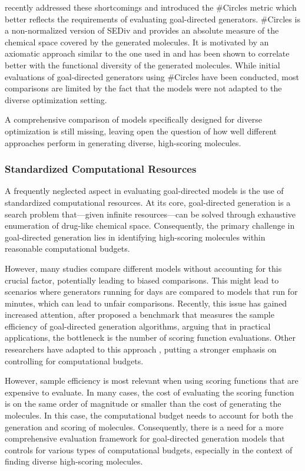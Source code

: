 \citet{xieHowMuchSpace2023} recently addressed these shortcomings and introduced the \#Circles
metric which better reflects the requirements of evaluating goal-directed generators. \#Circles is a
non-normalized version of SEDiv and provides an absolute measure of the chemical space covered by
the generated molecules. It is motivated by an axiomatic approach similar to the one used in
\citep{waldmanNovelAlgorithmsOptimization2000} and has been shown to correlate better with the
functional diversity of the generated molecules. While initial evaluations of goal-directed generators using \#Circles have been conducted, most comparisons are limited by the
fact that the models were not adapted to the diverse optimization setting.

A comprehensive
comparison of models specifically designed for diverse optimization is still missing, leaving open
the question of how well different approaches perform in generating diverse, high-scoring molecules.

\subsubsection{Standardized Computational Resources}
A frequently neglected aspect in evaluating goal-directed models is the use of standardized
computational resources. At its core, goal-directed generation is a search problem
that—given infinite resources—can be solved through exhaustive enumeration of drug-like chemical space.
Consequently, the primary challenge in goal-directed generation lies in identifying high-scoring molecules
within reasonable computational budgets.

However, many studies compare different models without accounting for this crucial factor,
potentially leading to biased comparisons. This might lead to scenarios where generators running for
days are compared to models that run for minutes, which can lead to unfair comparisons. Recently,
this issue has gained increased attention, after \citep{gaoSampleEfficiencyMatters2022} proposed a
benchmark that measures the sample efficiency of goal-directed generation algorithms, arguing
that in practical applications, the bottleneck is the number of scoring function evaluations. Other
researchers have adapted to this approach \citep{thomasReevaluatingSampleEfficiency2022,thomasAugmentedHillClimbIncreases2022,guoAugmentedMemoryCapitalizing2023},
putting a stronger emphasis on controlling for computational budgets.

However, sample efficiency is most relevant when using scoring functions that are expensive to
evaluate. In many cases, the cost of evaluating the scoring function is on the same order of
magnitude or smaller than the cost of generating the molecules. In this case, the computational
budget needs to account for both the generation and scoring of molecules. Consequently, there is a
need for a more comprehensive evaluation framework for goal-directed generation models that controls
for various types of computational budgets, especially in the context of finding diverse high-scoring
molecules.

